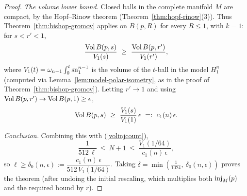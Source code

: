 \begin{proof}
\emph{The volume lower bound.} Closed balls in the complete
manifold $M$ are compact, by the Hopf--Rinow theorem
(Theorem~\ref{thm:hopf-rinow}(3)). Thus
Theorem~\ref{thm:bishop-gromov} applies on $B(p,R)$ for every
$R\le1$, with $k=1$: for $s<r'<1$,
$$\frac{\operatorname{Vol} B(p,s)}{V_1(s)}\ \ge\ \frac{\operatorname{Vol} B(p,r')}{V_1(r')},$$
where $V_1(t)=\omega_{n-1}\int_0^t\operatorname{sn}_1^{n-1}$ is the volume of
the $t$-ball in the model $H^n_1$ (computed via
Lemma~\ref{lem:model-polar-isometry}, as in the proof of
Theorem~\ref{thm:bishop-gromov}). Letting $r'\to1$ and using
$\operatorname{Vol} B(p,r')\to\operatorname{Vol} B(p,1)\ge\epsilon$,
$$\Vol B(p,s)\ \ge\ \frac{V_1(s)}{V_1(1)}\,\epsilon
\ =:\ c_1(n)\,\epsilon.$$

\emph{Conclusion.} Combining this with (\ref{volinjcount}),
$$\frac{1}{512\,\ell}\ \le\ N+1\ \le\
\frac{V_1(1/64)}{c_1(n)\,\epsilon},$$
so $\ell\ge\delta_0(n,\epsilon):=
\dfrac{c_1(n)\,\epsilon}{512\,V_1(1/64)}$. Taking
$\delta=\min\left(\tfrac1{1024},\ \delta_0(n,\epsilon)\right)$
proves the theorem (after undoing the initial rescaling, which
multiplies both $\operatorname{inj}_M(p)$ and the required bound by $r$).
\end{proof}
